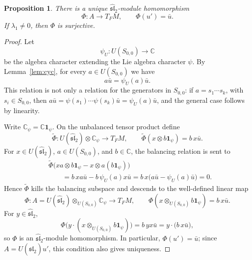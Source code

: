 \documentclass[11pt]{article}
\newcommand{\C}{\mathbb C}
\newcommand{\slh}{\widehat{\mathfrak{sl}}_2}
\theoremstyle{plain}
\newtheorem{proposition}[lemma]{Proposition}
\theoremstyle{remark}
\begin{document}
\begin{proposition}\label{prop:phi}
There is a unique \(\slh\)-module homomorphism
\[
  \Phi:A\longrightarrow T_FM,\qquad \Phi(u')=\bar u.
\]
If \(\lambda_1\ne0\), then \(\Phi\) is surjective.
\end{proposition}

\begin{proof}
Let
\[
  \psi_U:U(S_{0,0})\longrightarrow\C
\]
be the algebra character extending the Lie algebra character \(\psi\). By
Lemma~\ref{lem:cyc}, for every \(a\in U(S_{0,0})\) we have
\[
  a\bar u=\psi_U(a)\bar u.
\]
This relation is not only a relation for the generators in \(S_{0,0}\): if
\(a=s_1\cdots s_k\), with \(s_i\in S_{0,0}\), then
\(a\bar u=\psi(s_1)\cdots\psi(s_k)\bar u=\psi_U(a)\bar u\), and the
general case follows by linearity.

Write \(\C_\psi=\C\mathbf 1_\psi\). On the unbalanced tensor product define
\[
  \widetilde\Phi:U(\slh)\otimes\C_\psi\longrightarrow T_FM,
  \qquad
  \widetilde\Phi(x\otimes b\mathbf 1_\psi)=b\,x\bar u.
\]
For \(x\in U(\slh)\), \(a\in U(S_{0,0})\), and \(b\in\C\), the balancing
relation is sent to
\[
\begin{aligned}
  &\widetilde\Phi\bigl(xa\otimes b\mathbf 1_\psi
      -x\otimes a(b\mathbf 1_\psi)\bigr) \\
  &\qquad=b\,xa\bar u-b\,\psi_U(a)x\bar u
   =b\,x\bigl(a\bar u-\psi_U(a)\bar u\bigr)=0.
\end{aligned}
\]
Hence \(\widetilde\Phi\) kills the balancing subspace and descends to the
well-defined linear map
\[
  \Phi:A=U(\slh)\otimes_{U(S_{0,0})}\C_\psi\longrightarrow T_FM,
  \qquad \Phi(x\otimes_{U(S_{0,0})}b\mathbf 1_\psi)=b\,x\bar u.
\]
For \(y\in\slh\),
\[
  \Phi\bigl(y\cdot(x\otimes_{U(S_{0,0})}b\mathbf 1_\psi)\bigr)
  =b\,yx\bar u
  =y\cdot\bigl(b\,x\bar u\bigr),
\]
so \(\Phi\) is an \(\slh\)-module homomorphism. In particular,
\(\Phi(u')=\bar u\); since \(A=U(\slh)u'\), this condition also gives
uniqueness.


\end{proof}
\end{document}
